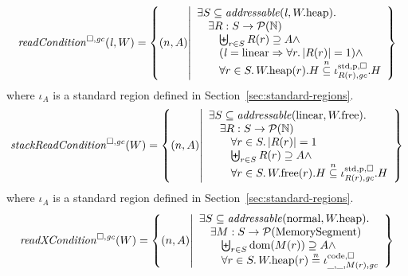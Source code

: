 \documentclass[a4paper]{article}
\begin{document}
\[
  \readCond{\lin,W} = \left\{ \npair{A} \middle| 
    \begin{array}{l}
      \exists S \subseteq \addressable{\lin, \pwheap} \ldotp \\
      \quad \exists R : S \fun \powerset{\nats} \\
      \qquad \biguplus_{r\in S} R(r) \supseteq A \wedge\\
      \qquad (\lin = \linear \Rightarrow \forall r\ldotp |R(r)|  = 1) \wedge\\
      \qquad \forall r \in S \ldotp \pwheap(r).H \nsubeq \stdreg{R(r),\gc}{\pur}.H
    \end{array}
  \right\}
\]
where $\iota_A$ is a standard region defined in Section~\ref{sec:standard-regions}.
\[
  \stackReadCond{W} = \left\{ \npair{A} \middle| 
    \begin{array}{l}
      \exists S \subseteq \addressable{\linear, \pwfree} \ldotp \\
      \quad \exists R : S \fun \powerset{\nats} \\
      \qquad \forall r \in S \ldotp |R(r)| = 1\\
      \qquad \biguplus_{r\in S} R(r) \supseteq A \wedge \\
      \qquad \forall r \in S \ldotp \pwfree(r).H \nsubeq \stdreg{R(r),\gc}{\pur}.H
    \end{array}
  \right\}
\]
where $\iota_A$ is a standard region defined in Section~\ref{sec:standard-regions}.
\[
  \xReadCond{W} = \left\{ \npair{A} \middle| 
    \begin{array}{l}
      \exists S \subseteq \addressable{\normal, \pwheap} \ldotp \\
      \quad \exists M : S \fun \powerset{\MemSeg} \\
      \qquad \biguplus_{r\in S} \dom(M(r)) \supseteq A \wedge\\
      \qquad \forall r \in S \ldotp \pwheap(r) \nequal \codereg{\_,\_,M(r),\gc}
    \end{array}
  \right\}
\]
\end{document}
